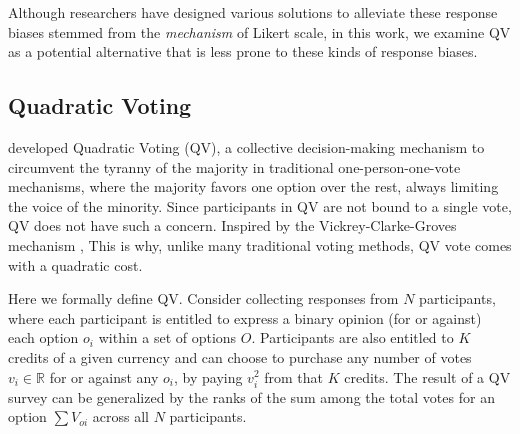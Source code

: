 Although researchers have designed various solutions to alleviate these response biases stemmed from the \textit{mechanism} of Likert scale, in this work, we examine QV as a potential alternative that is less prone to these kinds of response biases.

\subsection{Quadratic Voting}
\textcite{posner2018radical} developed Quadratic Voting (QV), a collective decision-making mechanism \cite{lalley2018quadratic} to circumvent the tyranny of the majority in traditional one-person-one-vote mechanisms, where the majority favors one option over the rest, always limiting the voice of the minority. Since participants in QV are not bound to a single vote, QV does not have such a concern. Inspired by the Vickrey-Clarke-Groves mechanism \cite{roughgarden2010algorithmic},  This is why, unlike many traditional voting methods, QV vote comes with a quadratic cost. 

% 


Here we formally define QV. Consider collecting responses from $N$ participants, where each participant is entitled to express a binary opinion (for or against) each option $o_i$ within a set of options $O$. Participants are also entitled to $K$ credits of a given currency and can choose to purchase any number of votes $v_i \in \mathbb{R}$ for or against any $o_i$, by paying $v_i^2$ from that $K$ credits. The result of a QV survey can be generalized by the ranks of the sum among the total votes for an option $\sum{V_{oi}}$ across all $N$ participants.\par

